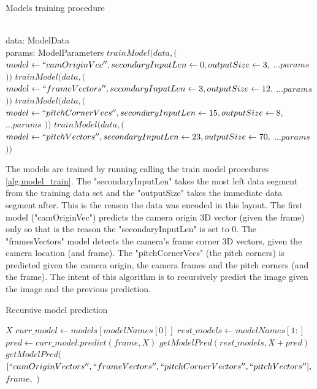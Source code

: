 \documentclass[
    11pt,
    oneside
]{report}
\begin{document}
\begin{algorithm}[H]
\begin{algorithmic}
\caption{Models training procedure}\label{alg:model_train}
\Require \\
    data: ModelData \\
    params: ModelParameters
\State
\State $trainModel( data, ($
    \State \indent $model \gets ``camOriginVec'', secondaryInputLen \gets 0, outputSize \gets 3,$
    \State \indent $\ldots params$ 
\State $) )$
\State $trainModel( data, ($
    \State \indent $model \gets ``frameVectors'', secondaryInputLen \gets 3, outputSize \gets 12,$
    \State \indent $\ldots params$ 
\State $) )$
\State $trainModel( data, ($
    \State \indent $model \gets ``pitchCornerVecs'', secondaryInputLen \gets 15, outputSize \gets 8,$
    \State \indent $\ldots params$ 
\State $) )$
\State $trainModel( data, ($
    \State \indent $model \gets ``pitchVectors'', secondaryInputLen \gets 23, outputSize \gets 70,$
    \State \indent $\ldots params$ 
\State $) )$
\end{algorithmic}
\end{algorithm}


The models are trained by running calling the train model procedures \ref{alg:model_train}. The "secondaryInputLen" takes the most left data segment from the training data set and the "outputSize" takes the immediate data segment after. This is the reason the data was encoded in this layout. The first model ("camOriginVec") predicts the camera origin 3D vector (given the frame) only so that is the reason the "secondaryInputLen" is set to 0. The "framesVectors" model detects the camera's frame corner 3D vectors, given the camera location (and frame). The "pitchCornerVecs" (the pitch corners) is predicted given the camera origin, the camera frames and the pitch corners (and the frame). The intent of this algorithm is to recursively predict the image given the image and the previous prediction.


\begin{algorithm}[H]
\begin{algorithmic}
\caption{Recursive model prediction}\label{alg:rec_pred}
        \State
        \Return $X$
    \EndIf
    \State $curr\_model \gets models[modelNames[0]]$ 
    \State $rest\_models \gets modelNames[1:]$
    \State $pred \gets curr\_model.predict(frame, X)$
    \State
    \Return $getModelPred(rest\_models, X + pred)$
\EndProcedure
{}
    \State
    \Return $getModelPred($
        \State \indent $[``camOriginVectors'', ``frameVectors'', ``pitchCornerVectors'', ``pitchVectors''],$
        \State \indent $frame,$
        \State \indent \emptyset
        \State
    \State $)$
\EndProcedure
\end{algorithmic}
\end{algorithm}
\end{document}
